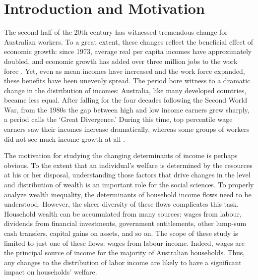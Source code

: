 \chapter{Introduction and Motivation}


The second half of the 20th century has witnessed tremendous change for Australian workers. To a great extent, these changes reflect the beneficial effect of economic growth: since 1973, average real per capita incomes have approximately doubled, and economic growth has added over three million jobs to the work force \citep{ABS5206,LFSApr2013}. Yet, even as mean incomes have increased and the work force expanded, these benefits have been unevenly spread. The period bore witness to a dramatic change in the distribution of incomes: Australia, like many developed countries, became less equal. After falling for the four decades following the Second World War, from the 1980s the gap between high and low income earners grew sharply, a period \citet{Leigh2013} calls the `Great Divergence.' During this time, top percentile wage earners saw their incomes increase dramatically, whereas some groups of workers did not see much income growth at all \citep{Atkinson1997,Borland1999,Leigh2013}.

The motivation for studying the changing determinants of income is perhaps obvious. To the extent that an individual's welfare is determined by the resources at his or her disposal, understanding those factors that drive changes in the level and distribution of wealth is an important role for the social sciences. To properly analyze wealth inequality, the determinants of household income flows need to be understood. However, the sheer diversity of these flows complicates this task. Household wealth can be accumulated from many sources: wages from labour, dividends from financial investments, government entitlements, other lump-sum cash transfers, capital gains on assets, and so on. The scope of these study is limited to just one of these flows: wages from labour income. Indeed, wages are the principal source of income for the majority of Australian households. Thus, any changes to the distribution of labor income are likely to have a significant impact on households' welfare. 


